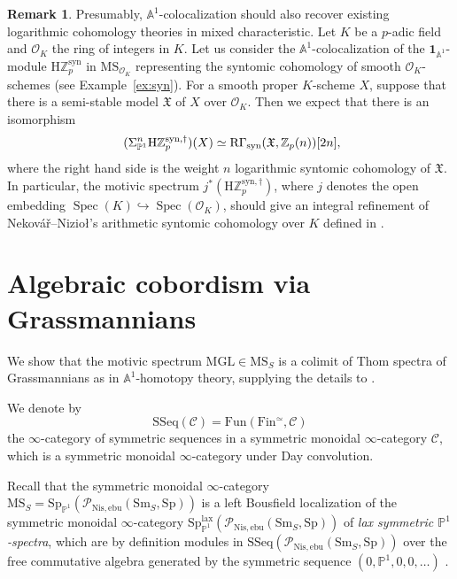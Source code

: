 \documentclass{amsart}
\numberwithin{equation}{section}
\theoremstyle{plain}
\theoremstyle{definition}
\newtheorem{remark}[equation]{Remark}
\let\scr=\mathcal
\let\bb=\mathbb
\def\Z{\bb Z}
\def\A{\bb A}
\def\P{\bb P}
\def\1{\mathbf 1}
\let\into=\hookrightarrow
\DeclareMathOperator{\Spec}{Spec}
\def\HH{\mathrm{H}}
\def\SSeq{\mathrm{SSeq}}
\def\Nis{\mathrm{Nis}}
\let\cat=\mathrm
\def\MGL{\mathrm{MGL}}
\def\Sm{{\cat{S}\mathrm{m}}}
\def\Fin{\cat F\mathrm{in}}
\def\MS{\mathrm{MS}}
\def\Sp{\mathrm{Sp}}
\def\Fun{\mathrm{Fun}}
\def\ebu{\mathrm{ebu}}
\newcommand{\syn}{\mathrm{syn}}
\begin{document}
\begin{remark}
Presumably, $\A^1$-colocalization should also recover existing logarithmic cohomology theories in mixed characteristic.
Let $K$ be a $p$-adic field and $\mathcal{O}_K$ the ring of integers in $K$.
Let us consider the $\A^1$-colocalization of the $\1_{\A^1}$-module $\HH\Z_p^\syn$ in $\MS_{\mathcal{O}_K}$ representing the syntomic cohomology of smooth $\mathcal{O}_K$-schemes (see Example~\ref{ex:syn}).
For a smooth proper $K$-scheme $X$, suppose that there is a semi-stable model $\mathfrak{X}$ of $X$ over $\mathcal{O}_K$.
Then we expect that there is an isomorphism
\[
	(\Sigma_{\P^1}^n\HH\Z_p^{\syn,\dagger})(X) \simeq \mathrm{R}\Gamma_\syn(\mathfrak{X},\Z_p(n))[2n] \rlap,
\]
where the right hand side is the weight $n$ logarithmic syntomic cohomology of $\mathfrak{X}$.
In particular, the motivic spectrum $j^*(\HH\Z_p^{\syn,\dagger})$, where $j$ denotes the open embedding $\Spec(K)\into\Spec(\mathcal{O}_K)$, should give an integral refinement of Neková\v{r}--Nizio\l's arithmetic syntomic cohomology over $K$ defined in \cite{NN}.
\end{remark}



\section{Algebraic cobordism via Grassmannians}
\label{sec:lisse}

We show that the motivic spectrum $\MGL\in\MS_S$ is a colimit of Thom spectra of Grassmannians as in $\A^1$-homotopy theory, supplying the details to \cite[Remark 7.7]{AHI}.

We denote by
\[
\SSeq(\scr C) = \Fun(\Fin^\simeq, \scr C)
\]
the $\infty$-category of symmetric sequences in a symmetric monoidal $\infty$-category $\scr C$, which is a symmetric monoidal $\infty$-category under Day convolution.

Recall that the symmetric monoidal $\infty$-category $\MS_S=\Sp_{\P^1}(\scr P_{\Nis,\ebu}(\Sm_S,\Sp))$ is a left Bousfield localization of the symmetric monoidal $\infty$-category $\Sp_{\P^1}^\mathrm{lax}(\scr P_{\Nis,\ebu}(\Sm_S,\Sp))$ of \emph{lax symmetric $\P^1$-spectra}, which are by definition modules in $\SSeq(\scr P_{\Nis,\ebu}(\Sm_S,\Sp))$ over the free commutative algebra generated by the symmetric sequence $(0,\P^1,0,0,\dotsc)$ \cite[Definition 1.3.4]{AnnalaIwasa2}.
\end{document}
